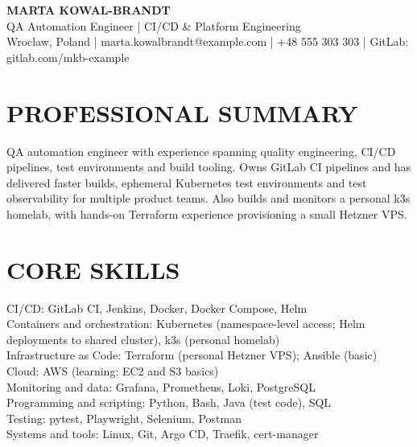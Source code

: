 \documentclass[11pt,a4paper]{article}
\begin{document}
\begin{center}
{\Huge\bfseries\color{primarycolor} MARTA KOWAL-BRANDT}\\[0.35em]
{\large QA Automation Engineer | CI/CD \& Platform Engineering}\\[0.25em]
Wroclaw, Poland | marta.kowalbrandt@example.com | +48 555 303 303 | GitLab: gitlab.com/mkb-example
\end{center}
\section*{PROFESSIONAL SUMMARY}
QA automation engineer with experience spanning quality engineering, CI/CD pipelines, test environments and build tooling. Owns GitLab CI pipelines and has delivered faster builds, ephemeral Kubernetes test environments and test observability for multiple product teams. Also builds and monitors a personal k3s homelab, with hands-on Terraform experience provisioning a small Hetzner VPS.
\section*{CORE SKILLS}
CI/CD: GitLab CI, Jenkins, Docker, Docker Compose, Helm\\
Containers and orchestration: Kubernetes (namespace-level access; Helm deployments to shared cluster), k3s (personal homelab)\\
Infrastructure as Code: Terraform (personal Hetzner VPS); Ansible (basic)\\
Cloud: AWS (learning: EC2 and S3 basics)\\
Monitoring and data: Grafana, Prometheus, Loki, PostgreSQL\\
Programming and scripting: Python, Bash, Java (test code), SQL\\
Testing: pytest, Playwright, Selenium, Postman\\
Systems and tools: Linux, Git, Argo CD, Traefik, cert-manager
\end{document}
